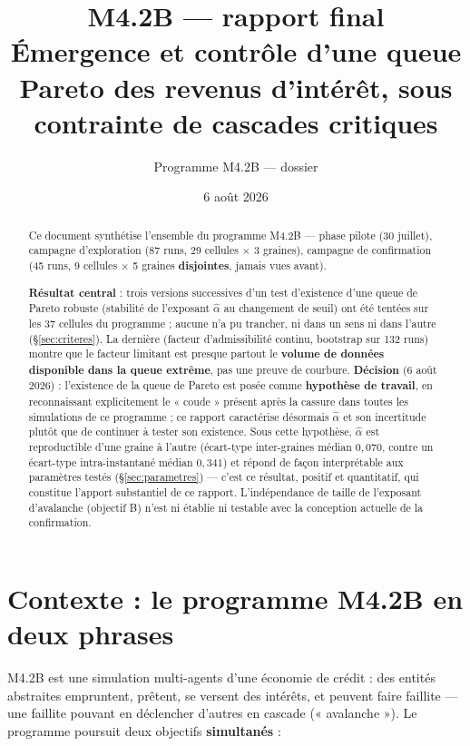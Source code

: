 \documentclass[11pt,a4paper]{article}
\title{M4.2B --- rapport final\\
\large Émergence et contrôle d'une queue Pareto des revenus d'intérêt,
sous contrainte de cascades critiques}
\author{Programme M4.2B --- dossier \code{m4\_2b\_credit\_soc}}
\date{6 août 2026}
\begin{document}
\maketitle

\begin{abstract}
Ce document synthétise l'ensemble du programme M4.2B --- phase pilote
(30 juillet), campagne d'exploration (87 runs, 29 cellules $\times$ 3
graines), campagne de confirmation (45 runs, 9 cellules $\times$ 5
graines \textbf{disjointes}, jamais vues avant).

\textbf{Résultat central} : trois versions successives d'un test
d'existence d'une queue de Pareto robuste (stabilité de l'exposant
$\hat\alpha$ au changement de seuil) ont été tentées sur les 37
cellules du programme ; aucune n'a pu trancher, ni dans un sens ni dans
l'autre (\S\ref{sec:criteres}). La dernière (facteur d'admissibilité
continu, bootstrap sur 132 runs) montre que le facteur limitant est
presque partout le \textbf{volume de données disponible dans la queue
extrême}, pas une preuve de courbure. \textbf{Décision} (6 août 2026) :
l'existence de la queue de Pareto est posée comme \textbf{hypothèse de
travail}, en reconnaissant explicitement le « coude » présent après la
cassure dans toutes les simulations de ce programme ; ce rapport
caractérise désormais $\hat\alpha$ et son incertitude plutôt que de
continuer à tester son existence. Sous cette hypothèse, $\hat\alpha$ est
reproductible d'une graine à l'autre (écart-type inter-graines médian
$0{,}070$, contre un écart-type intra-instantané médian $0{,}341$) et
répond de façon interprétable aux paramètres testés
(\S\ref{sec:parametres}) --- c'est ce résultat, positif et quantitatif,
qui constitue l'apport substantiel de ce rapport. L'indépendance de
taille de l'exposant d'avalanche (objectif B) n'est ni établie ni
testable avec la conception actuelle de la confirmation.
\end{abstract}

\tableofcontents

\section{Contexte : le programme M4.2B en deux phrases}

M4.2B est une simulation multi-agents d'une économie de crédit : des
entités abstraites empruntent, prêtent, se versent des intérêts, et
peuvent faire faillite --- une faillite pouvant en déclencher d'autres
en cascade (« avalanche »). Le programme poursuit deux objectifs
\textbf{simultanés} :
\end{document}
